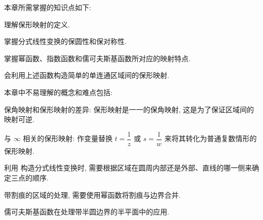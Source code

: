 
本章所需掌握的知识点如下:
\begin{enuma}
  \item 理解保形映射的定义.
  \item 掌握分式线性变换的保圆性和保对称性.
  \item 掌握幂函数、指数函数和儒可夫斯基函数所对应的映射特点.
  \item 会利用上述函数构造简单的单连通区域间的保形映射.
\end{enuma}

本章中不易理解的概念和难点包括:
\begin{enuma}
  \item 保角映射和保形映射的差异: 保形映射是一一的保角映射, 这是为了保证区域间的映射可逆.
  \item 与 $\infty$ 相关的保形映射: 作变量替换 $t=\dfrac1z$ 或 $s=\dfrac1w$ 来将其转化为普通复数情形的保形映射.
  \item 利用 构造分式线性变换时, 需要根据区域在圆周内部还是外部、直线的哪一侧来确定三点的顺序.
  \item 带割痕的区域的处理, 需要使用幂函数将割痕与边界合并.
  \item 儒可夫斯基函数在处理带半圆边界的半平面中的应用.
\end{enuma}


